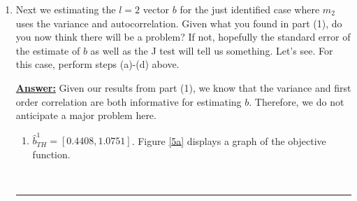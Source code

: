 \documentclass{article} %
\theoremstyle{definition}
\newenvironment{solution}[1][Answer]{\begin{singlespace}\underline{\textbf{#1:}}\quad }{\ \rule{0.3em}{0.3em}\end{singlespace}} %
\begin{document}
\begin{enumerate}
\begin{solution}
\begin{enumerate}[label=(\alph*)]
\begin{equation*}
\begin{bmatrix}
											0.22 & 0.06 \\
											3.66 & 3.11
											\end{bmatrix}
				\end{equation*}
				The variance-covariance matrix of $\hat{b}^{2}_{TH}$ is given by
				\begin{equation*}
											\begin{bmatrix}
											0.01 & -4.07e-3 \\
											-4.07e-3 & 0.01
											\end{bmatrix}
				\end{equation*}
				The standard errors are given by
				\begin{equation*}
											\begin{bmatrix}
											0.08 \\
											0.11
											\end{bmatrix}
				\end{equation*}
				For local identification, it is useful to have the elements of $\nabla_{b} g_{T}(\hat{b}^{2}_{TH})$ to be relatively large. This is because if the distance between the modeled moments and the data moments is changing rapidly around the optimal parameter choices, we can be more confident in the precision with which we've identified the local optimal parameter values.
			\item The $J$-test value is $1.17e-6$.
		\end{enumerate}
		\end{solution}
		\item Next we estimating the $ l = 2 $ vector $ b $ for the just identified case where $ m_2 $ uses the variance and autocorrelation. Given what you found in part (1), do you now think there will be a problem? If not, hopefully the standard error of the estimate of $ b $ as well as the J test will tell us something. Let’s see. For this case, perform steps (a)-(d) above.
		\begin{solution}
		Given our results from part (1), we know that the variance and first order correlation are both informative for estimating $b$. Therefore, we do not anticipate a major problem here.
		\begin{enumerate}[label=(\alph*)]
			\item $\hat{b}_{TH}^{1}=[0.4408,1.0751]$. Figure \ref{5a} displays a graph of the objective function.
			\begin{figure}[htbp] 
				\centering

\end{figure}
\end{enumerate}
\end{solution}
\end{enumerate}
\end{document}
